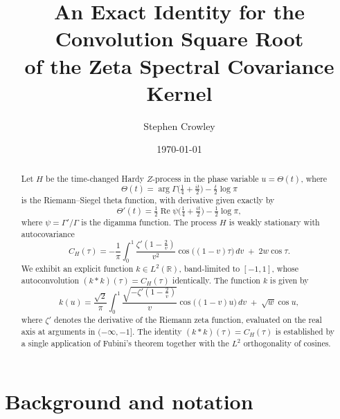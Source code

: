 \documentclass[11pt,reqno]{amsart}
\title{An Exact Identity for the Convolution Square Root\\
of the Zeta Spectral Covariance Kernel}
\author{Stephen Crowley}
\date{\today}
\theoremstyle{definition}
\theoremstyle{remark}
\begin{document}
\maketitle

\begin{abstract}
Let \(H\) be the time-changed Hardy \(Z\)-process in the phase variable
\(u = \Theta(t)\), where
\[
  \Theta(t) = \arg\Gamma\!\bigl(\tfrac{1}{4}+\tfrac{it}{2}\bigr) - \tfrac{t}{2}\log\pi
\]
is the Riemann--Siegel theta function, with derivative given exactly by
\[
  \Theta'(t) = \tfrac{1}{2}\operatorname{Re}\psi\!\bigl(\tfrac{1}{4}+\tfrac{it}{2}\bigr)
               - \tfrac{1}{2}\log\pi,
\]
where \(\psi = \Gamma'/\Gamma\) is the digamma function. The process \(H\) is weakly
stationary with autocovariance
\[
C_H(\tau)
= -\frac{1}{\pi}\int_0^1
  \frac{\zeta'\!\left(1-\tfrac{2}{v}\right)}{v^2}
  \cos\!\bigl((1-v)\tau\bigr)\,dv
  \;+\; 2w\cos\tau.
\]
We exhibit an explicit function \(k \in L^2(\mathbb{R})\), band-limited
to \([-1,1]\), whose autoconvolution \((k*k)(\tau) = C_H(\tau)\)
identically. The function \(k\) is given by
\[
k(u)
= \frac{\sqrt{2}}{\pi}\int_0^1
  \frac{\sqrt{-\zeta'\!\left(1-\tfrac{2}{v}\right)}}{v}
  \cos\!\bigl((1-v)u\bigr)\,dv
  \;+\; \sqrt{w}\cos u,
\]
where \(\zeta'\) denotes the derivative of the Riemann zeta function,
evaluated on the real axis at arguments in \((-\infty,-1]\). The
identity \((k*k)(\tau) = C_H(\tau)\) is established by a single
application of Fubini's theorem together with the \(L^2\) orthogonality
of cosines.
\end{abstract}

\tableofcontents

\section{Background and notation}
\end{document}
